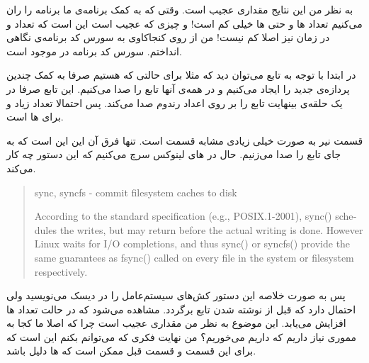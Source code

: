 به نظر من این نتایج مقداری عجیب است. وقتی که به کمک برنامه‌ی
ما برنامه را ران می‌کنیم تعداد
ها
و حتی
ها خیلی کم است! و چیزی که عجیب است این است که تعداد
 و 
در زمان
نیز اصلا کم نیست! من از روی کنجاکاوی به سورس کد برنامه‌ی
نگاهی انداختم. سورس کد برنامه در
موجود است.

در ابتدا با توجه به تابع
می‌توان دید که مثلا برای حالتی که
هستیم صرفا به کمک
چندین پردازه‌ی جدید را ایجاد می‌کنیم و در همه‌ی آنها تابع
را صدا می‌کنیم. این تابع صرفا در یک حلقه‌ی بینهایت تابع
را بر روی اعداد رندوم صدا می‌کند.
پس احتمالا تعداد زیاد
 و 
برای
ها
است.

قسمت
نیر به صورت خیلی زیادی مشابه قسمت
است. تنها فرق آن این این است که به جای
تابع
را صدا می‌زنیم. حال در
های
لینوکس سرچ می‌کنیم که این دستور چه کار می‌کند.
\begin{latin}
    \begin{quote}
        sync, syncfs - commit filesystem caches to disk

        According to the standard specification  (e.g.,  POSIX.1-2001),  sync()
       schedules the writes, but may return before the actual writing is done.
       However Linux waits for I/O completions, and thus  sync()  or  syncfs()
       provide the same guarantees as fsync() called on every file in the system or filesystem respectively.
    \end{quote}
\end{latin}
پس به صورت خلاصه این دستور کش‌های سیستم‌عامل را در دیسک می‌نویسید ولی احتمال دارد که قبل از نوشته شدن تابع برگردد.
مشاهده می‌شود که در حالت
تعداد
ها
افزایش می‌یابد. این موضوع به نظر من مقداری عجیب است چرا که اصلا ما کجا به مموری نیاز داریم که داریم
می‌خوریم؟ من نهایت فکری که می‌توانم بکنم این است که برای این قسمت و قسمت قبل ممکن است که
ها
دلیل
باشد.